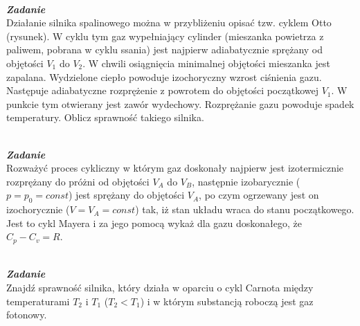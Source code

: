 \documentclass[11pt,a4paper]{article}
\newcounter{zadanie}\newcommand{\zadanie}[1][]{\addtocounter{zadanie}{1} ~\\  {\bf \emph{Zadanie \arabic{zadanie} #1 }} \\}
\begin{document}
\begin{figure}\vspace{-5mm}
\end{figure}
\zadanie
Działanie silnika spalinowego można w przybliżeniu opisać tzw. cyklem
Otto (rysunek). W cyklu tym gaz wypełniający cylinder (mieszanka powietrza z paliwem,
pobrana w cyklu ssania) jest najpierw adiabatycznie sprężany od objętości $V_1$
do $V_2$. W chwili osiągnięcia minimalnej objętości mieszanka jest zapalana. Wydzielone ciepło
powoduje izochoryczny wzrost ciśnienia gazu. Następuje adiabatyczne rozprężenie z powrotem
do objętości początkowej $V_1$. W punkcie tym otwierany jest zawór wydechowy.
Rozprężanie gazu powoduje spadek temperatury. Oblicz sprawność takiego silnika.

\zadanie
Rozważyć proces cykliczny w którym gaz doskonały najpierw jest izotermicznie rozprężany 
do próżni od objętości $V_A$ do $V_B$, 
następnie izobarycznie ($p=p_0=const$) jest sprężany do objętości $V_A$, 
po czym ogrzewany jest on izochorycznie ($V=V_A=const$) tak, 
iż stan układu wraca do stanu początkowego. 
Jest to cykl Mayera i za jego pomocą wykaż dla gazu doskonałego, że $C_p-C_v=R$.

\zadanie
Znajdź sprawność silnika, który działa w oparciu o cykl Carnota między temperaturami 
$T_2$ i $T_1$ ($T_2<T_1$) i w którym substancją roboczą jest gaz fotonowy.
\end{document}
